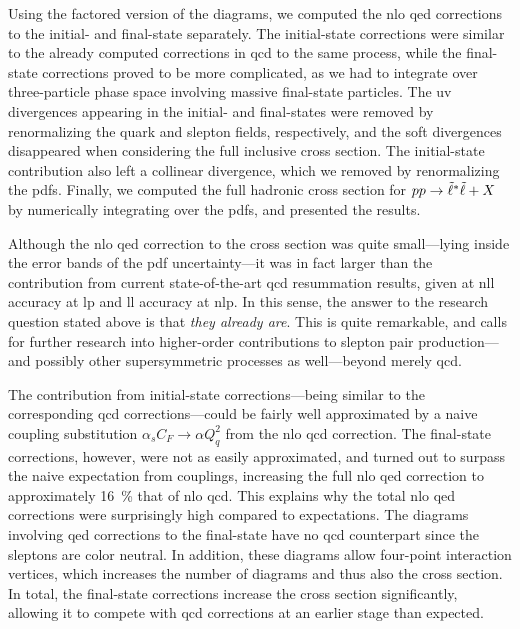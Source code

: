 Using the factored version of the diagrams, we computed the \gls{nlo} \gls{qed} corrections to the initial- and final-state separately.
The initial-state corrections were similar to the already computed corrections in \gls{qcd} to the same process, while the final-state corrections proved to be more complicated, as we had to integrate over three-particle phase space involving massive final-state particles.
The \gls{uv} divergences appearing in the initial- and final-states were removed by renormalizing the quark and slepton fields, respectively, and the soft divergences disappeared when considering the full inclusive cross section.
The initial-state contribution also left a collinear divergence, which we removed by renormalizing the \glspl{pdf}.
Finally, we computed the full hadronic cross section for $pp\to{\tilde{\ell}}^*{\tilde{\ell}}+X$ by numerically integrating over the \glspl{pdf}, and presented the results.

Although the \gls{nlo} \gls{qed} correction to the cross section was quite small---lying inside the error bands of the \gls{pdf} uncertainty---it was in fact larger than the contribution from current state-of-the-art \gls{qcd} resummation results, given at \gls{nll} accuracy at \gls{lp} and \gls{ll} accuracy at \gls{nlp}.
In this sense, the answer to the research question stated above is that \emph{they already are}.
This is quite remarkable, and calls for further research into higher-order contributions to slepton pair production---and possibly other supersymmetric processes as well---beyond merely \gls{qcd}.

The contribution from initial-state corrections---being similar to the corresponding \gls{qcd} corrections---could be fairly well approximated by a naive coupling substitution $\alpha_s C_F \to \alpha Q_q^2$ from the \gls{nlo} \gls{qcd} correction.
The final-state corrections, however, were not as easily approximated, and turned out to surpass the naive expectation from couplings, increasing the full \gls{nlo} \gls{qed} correction to approximately \qty{16}{\percent} that of \gls{nlo} \gls{qcd}.
This explains why the total \gls{nlo} \gls{qed} corrections were surprisingly high compared to expectations.
The diagrams involving \gls{qed} corrections to the final-state have no \gls{qcd} counterpart since the sleptons are color neutral.
In addition, these diagrams allow four-point interaction vertices, which increases the number of diagrams and thus also the cross section.
In total, the final-state corrections increase the cross section significantly, allowing it to compete with \gls{qcd} corrections at an earlier stage than expected.


